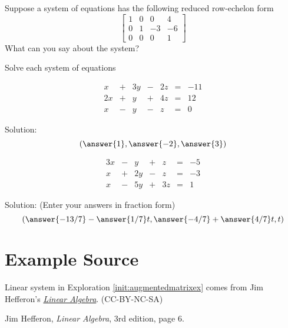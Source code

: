 \documentclass{ximera}
\begin{document}
\begin{problem} \label{prob:numberofsolutionsmultch}
Suppose a system of equations has the following reduced row-echelon form
  $$\left[\begin{array}{ccc|c}  
 1&0&0&4\\0&1&-3&-6\\0&0&0&1
 \end{array}\right]$$
 What can you say about the system?
 \begin{multipleChoice}
 \end{multipleChoice}
  \end{problem}
\begin{problem}
Solve each system of equations
\begin{problem}\label{prob:sys20solvesys1}
$$\begin{array}{ccccccc}
      x & +&3y&-&2z&= &-11 \\
	 2x& +&y&+&4z&=&12\\
     x& -&y&-&z&=&0
    \end{array}$$
    
    Solution:
    $$( \answer{1}, \answer{-2}, \answer{3})$$
\end{problem}

\begin{problem}\label{prob:sys20solvesys2}
$$\begin{array}{ccccccc}
      3x & -&y&+&z&= &-5 \\
	 x& +&2y&-&z&=&-3\\
     x& -&5y&+&3z&=&1
    \end{array}$$
    
    Solution: (Enter your answers in fraction form)
    $$\left(\answer{-13/7}-\answer{1/7}t, \answer{-4/7}+\answer{4/7}t, t\right)$$
\end{problem}
\end{problem}

\section*{Example Source} 

Linear system in Exploration \ref{init:augmentedmatrixex} comes from Jim Hefferon's \href{http://joshua.smcvt.edu/linearalgebra/#current_version}{\it Linear Algebra}. (CC-BY-NC-SA)

Jim Hefferon, {\it Linear Algebra}, 3rd edition, page 6.
\end{document}
